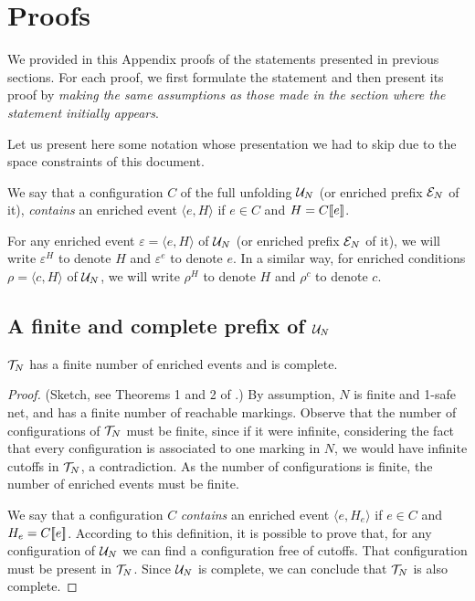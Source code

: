 
\appendix

\section{Proofs}
\label{ape:proofs}

We provided in this Appendix proofs of the statements presented in previous
sections.  For each proof, we first formulate the statement and then present
its proof by \emph{making the same assumptions as those made in the section
where the statement initially appears}.

Let us present here some notation whose presentation we had to skip due to the
space constraints of this document.

We say that a configuration $C$ of the full unfolding $\mathcal{U}_{N}$ (or enriched
prefix $\mathcal{E}_{N}$ of it), \emph{contains} an enriched event $\langle e, H
\rangle$ if $e \in C$ and $H = C [\![ e]\!]$.

For any enriched event $\varepsilon = \langle e, H \rangle$ of $\mathcal{U}_{N}$ (or
enriched prefix $\mathcal{E}_{N}$ of it), we will write $\varepsilon^H$ to denote $H$
and $\varepsilon^e$ to denote $e$.  In a similar way, for enriched conditions
$\rho = \langle c, H \rangle$ of $\mathcal{U}_{N}$, we will write $\rho^H$ to denote $H$
and $\rho^c$ to denote $c$.

\subsection{A finite and complete prefix of $\mathcal{U}_{N}$}

\setcounter{theorem}{8}
\begin{theorem}
$\mathcal{T}_{N}$ has a finite number of enriched events and is complete.
\end{theorem}

\begin{proof}
(Sketch, see Theorems 1 and 2 of .) By assumption, $N$ is finite
and 1-safe net, and has a finite number of reachable markings.  Observe that
the number of configurations of $\mathcal{T}_{N}$ must be finite, since if it were
infinite, considering the fact that every configuration is associated to one
marking in $N$, we would have infinite cutoffs in $\mathcal{T}_{N}$, a contradiction.
As the number of configurations is finite, the number of enriched events must
be finite.

We say that a configuration $C$ \emph{contains} an enriched event $\langle e,
H_e \rangle$ if $e \in C$ and $H_e = C [\![ e]\!]$.  According to this definition,
it is possible to prove that, for any configuration of $\mathcal{U}_{N}$ we can find a
configuration free of cutoffs.  That configuration must be present in $\mathcal{T}_{N}$.  Since $\mathcal{U}_{N}$ is complete, we can conclude that $\mathcal{T}_{N}$ is also
complete.
\end{proof}

